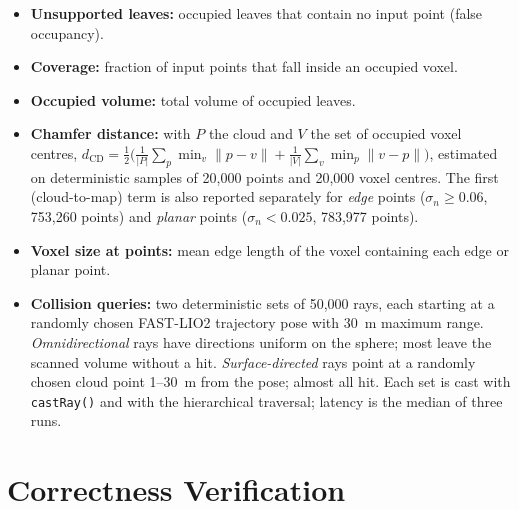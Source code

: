 \documentclass[11pt,a4paper]{report}
\begin{document}
\begin{itemize}
    \item \textbf{Unsupported leaves:} occupied leaves that contain no input point (false occupancy).
    \item \textbf{Coverage:} fraction of input points that fall inside an occupied voxel.
    \item \textbf{Occupied volume:} total volume of occupied leaves.
    \item \textbf{Chamfer distance:} with $P$ the cloud and $V$ the set of occupied voxel centres, $d_{\text{CD}} = \tfrac{1}{2}\big(\tfrac{1}{|P|}\sum_{p} \min_{v} \|p - v\| + \tfrac{1}{|V|}\sum_{v} \min_{p} \|v - p\|\big)$, estimated on deterministic samples of 20,000 points and 20,000 voxel centres. The first (cloud-to-map) term is also reported separately for \emph{edge} points ($\sigma_n \ge 0.06$, 753,260 points) and \emph{planar} points ($\sigma_n < 0.025$, 783,977 points).
    \item \textbf{Voxel size at points:} mean edge length of the voxel containing each edge or planar point.
    \item \textbf{Collision queries:} two deterministic sets of 50,000 rays, each starting at a randomly chosen FAST-LIO2 trajectory pose with 30~m maximum range. \emph{Omnidirectional} rays have directions uniform on the sphere; most leave the scanned volume without a hit. \emph{Surface-directed} rays point at a randomly chosen cloud point 1--30~m from the pose; almost all hit. Each set is cast with \texttt{castRay()} and with the hierarchical traversal; latency is the median of three runs.
\end{itemize}

\section{Correctness Verification}
\label{sec:verification}
\end{document}
